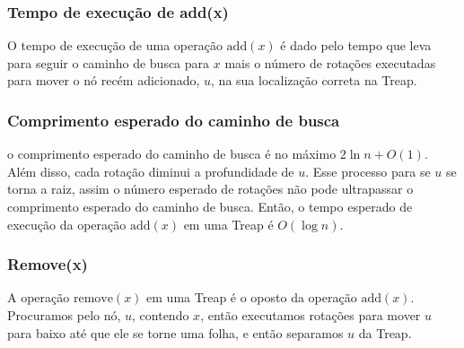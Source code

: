 \documentclass{beamer}
\begin{document}
\begin{frame}
\frametitle{Tempo de execução de add(x)}
O tempo de execução de uma operação \ensuremath{\ensuremath{\mathrm{add}(\ensuremath{\mathit{x}})}} é dado pelo tempo 
que leva para seguir o caminho de busca para \ensuremath{\ensuremath{\ensuremath{\mathit{x}}}} mais o número de rotações
executadas para mover o nó recém adicionado, \ensuremath{\ensuremath{\ensuremath{\mathit{u}}}}, na sua localização correta
na Treap. 
\end{frame}

\begin{frame}
\frametitle{Comprimento esperado do caminho de busca}
o comprimento esperado do
caminho de busca é no máximo $2\ln \ensuremath{\ensuremath{\ensuremath{\mathit{n}}}}+O(1)$.  Além disso, cada rotação
diminui a profundidade de \ensuremath{\ensuremath{\ensuremath{\mathit{u}}}}.   Esse processo para se \ensuremath{\ensuremath{\ensuremath{\mathit{u}}}} se torna a raiz, assim
o número esperado de rotações não pode ultrapassar o comprimento esperado
do caminho de busca.  Então, o tempo esperado de execução da operação \ensuremath{\ensuremath{\mathrm{add}(\ensuremath{\mathit{x}})}}
em uma Treap é $O(\log \ensuremath{\ensuremath{\ensuremath{\mathit{n}}}})$. 
\end{frame}
\begin{frame}
\frametitle{Remove(x)}
A operação \ensuremath{\ensuremath{\mathrm{remove}(\ensuremath{\mathit{x}})}} em uma Treap é o oposto da operação \ensuremath{\ensuremath{\mathrm{add}(\ensuremath{\mathit{x}})}}.
Procuramos pelo nó, \ensuremath{\ensuremath{\ensuremath{\mathit{u}}}}, contendo \ensuremath{\ensuremath{\ensuremath{\mathit{x}}}}, então executamos
rotações para mover \ensuremath{\ensuremath{\ensuremath{\mathit{u}}}} para baixo até que ele se torne uma folha, e então separamos
\ensuremath{\ensuremath{\ensuremath{\mathit{u}}}} da Treap.
\end{frame}
\end{document}
